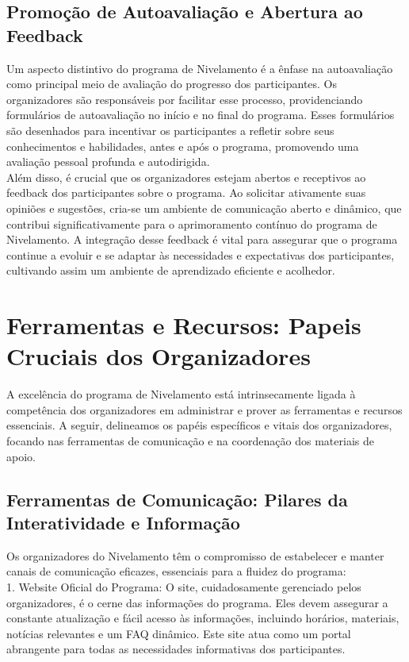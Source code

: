 \subsection{Promoção de Autoavaliação e Abertura ao Feedback}

Um aspecto distintivo do programa de Nivelamento é a ênfase na autoavaliação como principal meio de avaliação do progresso dos participantes. Os organizadores são responsáveis por facilitar esse processo, providenciando formulários de autoavaliação no início e no final do programa. Esses formulários são desenhados para incentivar os participantes a refletir sobre seus conhecimentos e habilidades, antes e após o programa, promovendo uma avaliação pessoal profunda e autodirigida.\\

Além disso, é crucial que os organizadores estejam abertos e receptivos ao feedback dos participantes sobre o programa. Ao solicitar ativamente suas opiniões e sugestões, cria-se um ambiente de comunicação aberto e dinâmico, que contribui significativamente para o aprimoramento contínuo do programa de Nivelamento. A integração desse feedback é vital para assegurar que o programa continue a evoluir e se adaptar às necessidades e expectativas dos participantes, cultivando assim um ambiente de aprendizado eficiente e acolhedor.


\section{Ferramentas e Recursos: Papeis Cruciais dos Organizadores}

A excelência do programa de Nivelamento está intrinsecamente ligada à competência dos organizadores em administrar e prover as ferramentas e recursos essenciais. A seguir, delineamos os papéis específicos e vitais dos organizadores, focando nas ferramentas de comunicação e na coordenação dos materiais de apoio.

\subsection{Ferramentas de Comunicação: Pilares da Interatividade e Informação}

Os organizadores do Nivelamento têm o compromisso de estabelecer e manter canais de comunicação eficazes, essenciais para a fluidez do programa:\\

1. Website Oficial do Programa: O site, cuidadosamente gerenciado pelos organizadores, é o cerne das informações do programa. Eles devem assegurar a constante atualização e fácil acesso às informações, incluindo horários, materiais, notícias relevantes e um FAQ dinâmico. Este site atua como um portal abrangente para todas as necessidades informativas dos participantes.

